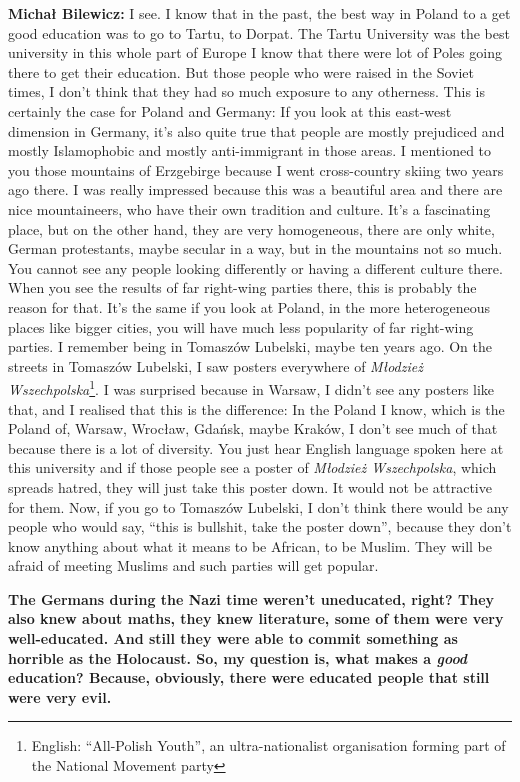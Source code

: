 \textbf{Michał Bilewicz:} I see. I know that in the past, the best way in Poland to a get good education was to go to Tartu, to Dorpat. The Tartu University was the best university in this whole part of Europe I know that there were lot of Poles going there to get their education. But those people who were raised in the Soviet times, I don’t think that they had so much exposure to any otherness. This is certainly the case for Poland and Germany: If you look at this east-west dimension in Germany, it’s also quite true that people are mostly prejudiced and mostly Islamophobic and mostly anti-immigrant in those areas. I mentioned to you those mountains of Erzgebirge because I went cross-country skiing two years ago there. I was really impressed because this was a beautiful area and there are nice mountaineers, who have their own tradition and culture. It’s a fascinating place, but on the other hand, they are very homogeneous, there are only white, German protestants, maybe secular in a way, but in the mountains not so much. You cannot see any people looking differently or having a different culture there. When you see the results of far right-wing parties there, this is probably the reason for that. It's the same if you look at Poland, in the more heterogeneous  places like bigger cities, you will have much less popularity of far right-wing parties. I remember being in Tomaszów Lubelski, maybe ten years ago. On the streets in Tomaszów Lubelski, I saw posters everywhere of \textit{Młodzież Wszechpolska}\footnote{English: ``All-Polish Youth'', an ultra-nationalist organisation forming part of the National Movement party}. I was surprised because in Warsaw, I didn’t see any posters like that, and I realised that this is the difference: In the Poland I know, which is the Poland of, Warsaw, Wrocław, Gdańsk, maybe Kraków, I don’t see much of that because there is a lot of diversity. You just hear English language spoken here at this university and if those people see a poster of \textit{Młodzież Wszechpolska}, which spreads hatred, they will just take this poster down. It would not be attractive for them. Now, if you go to Tomaszów Lubelski, I don’t think there would be any people who would say, ``this is bullshit, take the poster down'', because they don’t know anything about what it means to be African, to be Muslim. They will be afraid of meeting Muslims and such parties will get popular.

\textbf{The Germans during the Nazi time weren’t uneducated, right? They also knew about maths, they knew literature, some of them were very well-educated. And still they were able to commit something as horrible as the Holocaust. So, my question is, what makes a \textit{good} education? Because, obviously, there were educated people that still were very evil.}

